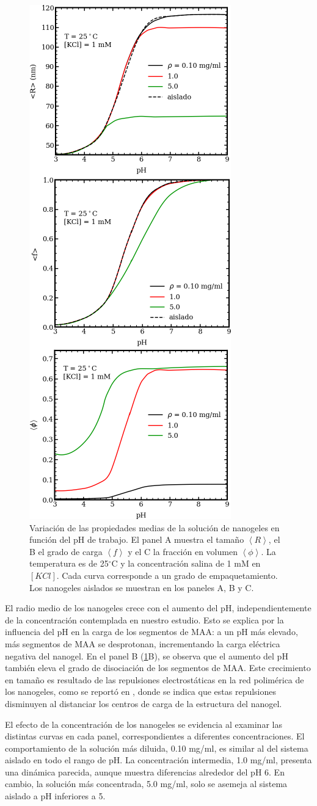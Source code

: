 	\begin{figure}[!htb]
		\centering
		\includegraphics[width=0.30\linewidth]{Figures/graph-mc/xvspH.pdf}
		\caption{Variaci\'on de las propiedades medias de la soluci\'on de nanogeles en funci\'on del pH de trabajo. El panel A muestra el tama\~no $\left<R\right>$, el B el grado de carga $\left<f\right>$ y el C la fracci\'on en volumen $\left<\phi\right>$. La temperatura es de 25$^\circ$C y la concentraci\'on salina de 1 mM en $[KCl]$. Cada curva corresponde a un grado de empaquetamiento. Los nanogeles aislados se muestran en los paneles A, B y C.}
		\label{fig:mc:xvspH}
	\end{figure}
	
	El radio medio de los nanogeles crece con el aumento del pH, independientemente de la concentraci\'on contemplada en nuestro estudio. Esto se explica por la  influencia del pH en la carga de los segmentos de MAA: a un pH m\'as elevado, m\'as segmentos de MAA se desprotonan, incrementando la carga el\'ectrica negativa del nanogel. En el panel B (\ref{fig:mc:xvspH}B), se observa que el aumento del pH tambi\'en eleva el grado de disociaci\'on de los segmentos de MAA. Este crecimiento en tama\~no es resultado de las repulsiones electrost\'aticas en la red polim\'erica de los nanogeles, como se report\'o en \cite{perez2021thermodynamic}, donde se indica que estas repulsiones disminuyen al distanciar los centros de carga de la estructura del nanogel.
	
	El efecto de la concentraci\'on de los nanogeles se evidencia al examinar las distintas curvas en cada panel, correspondientes a diferentes concentraciones. El comportamiento de la soluci\'on m\'as diluida, 0.10 mg/ml, es similar al del sistema aislado en todo el rango de pH. La concentraci\'on intermedia, 1.0 mg/ml, presenta una din\'amica parecida, aunque muestra diferencias alrededor del pH 6. En cambio, la soluci\'on m\'as concentrada, 5.0 mg/ml, solo se asemeja al sistema aislado a pH inferiores a 5.
	
